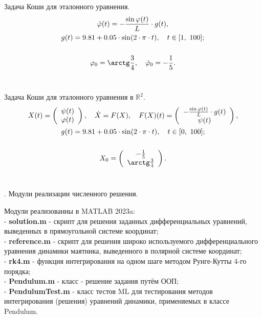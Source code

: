 \documentclass[a4paper,14pt]{extarticle}
\begin{document}
\noindent Задача Коши для эталонного уравнения.
\begin{gather*}
	\ddot{\varphi}(t) = -\frac{\sin\varphi(t)}{L}\cdot g(t), \\
	g(t) = 9.81 + 0.05\cdot\sin(2\cdot\pi\cdot t),\quad t\in[1,\ 100]; \\
	\\
	\varphi_0 = \arctg\frac{3}{4},\quad\dot{\varphi}_0 = -\frac{1}{5}.
\end{gather*} \\ \par

\noindent Задача Коши для эталонного уравнения в $\mathbb{R}^2$.
\begin{gather*}
	X(t) = \left(\begin{array}{c}
		\psi(t) \\
		\varphi(t)
	\end{array}\right),\quad\dot{X} = F(X),\quad
		F(X)(t) = \left(\begin{array}{c}
		-\frac{\sin\varphi(t)}{L}\cdot g(t) \\
		\psi(t)
	\end{array}\right), \\
	g(t) = 9.81 + 0.05\cdot\sin(2\cdot\pi\cdot t),\quad t\in[0,\ 100]; \\
	\\
	X_0 = \left(\begin{array}{c}
		-\frac{1}{5} \\
		\arctg\frac{3}{4}
	\end{array}\right).
\end{gather*} \\ \newpage

. Модули реализации численного решения. \\ \par
\noindent Модули реализованны в MATLAB 2023a: \\
- \textbf{solution.m} - скрипт для решения заданных дифференциальных уравнений, выведенных в прямоугольной системе координат; \\
- \textbf{reference.m} - скрипт для решения широко используемого дифференциального уравнения динамики маятника, выведенного в полярной системе координат; \\
- \textbf{rk4.m} - функция интегрирования на одном шаге методом Рунге-Кутты 4-го порядка; \\
- \textbf{Pendulum.m} - класс - решение задания путём ООП; \\
- \textbf{PendulumTest.m} - класс тестов ML для тестирования методов интегрирования (решения) уравнений динамики, применяемых в классе Pendulum.
\end{document}
